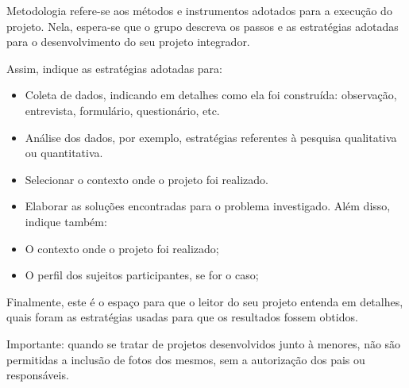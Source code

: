 Metodologia refere-se aos métodos e instrumentos adotados para a execução do
projeto. Nela, espera-se que o grupo descreva os passos e as estratégias adotadas para o
desenvolvimento do seu projeto integrador.

Assim, indique as estratégias adotadas para:

\begin{itemize}

\item Coleta de dados, indicando em detalhes como ela foi construída: observação,
entrevista, formulário, questionário, etc.
\item Análise dos dados, por exemplo, estratégias referentes à pesquisa qualitativa ou
quantitativa.
\item Selecionar o contexto onde o projeto foi realizado.
\item Elaborar as soluções encontradas para o problema investigado.
Além disso, indique também:
\item O contexto onde o projeto foi realizado;
\item O perfil dos sujeitos participantes, se for o caso;

\end{itemize}

Finalmente, este é o espaço para que o leitor do seu projeto entenda em detalhes,
quais foram as estratégias usadas para que os resultados fossem obtidos.

Importante: quando se tratar de projetos desenvolvidos junto à menores, não são
permitidas a inclusão de fotos dos mesmos, sem a autorização dos pais ou responsáveis.
